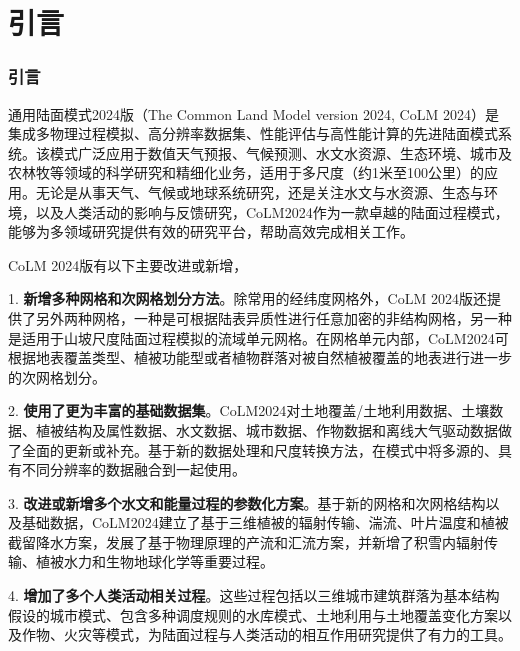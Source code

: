 \part{引言}
\section{引言}


通用陆面模式2024版（The Common Land Model version 2024, CoLM 2024）是集成多物理过程模拟、高分辨率数据集、性能评估与高性能计算的先进陆面模式系统。该模式广泛应用于数值天气预报、气候预测、水文水资源、生态环境、城市及农林牧等领域的科学研究和精细化业务，适用于多尺度（约1米至100公里）的应用。无论是从事天气、气候或地球系统研究，还是关注水文与水资源、生态与环境，以及人类活动的影响与反馈研究，CoLM2024作为一款卓越的陆面过程模式，能够为多领域研究提供有效的研究平台，帮助高效完成相关工作。

CoLM 2024版有以下主要改进或新增，

1. \textbf{新增多种网格和次网格划分方法}。除常用的经纬度网格外，CoLM 2024版还提供了另外两种网格，一种是可根据陆表异质性进行任意加密的非结构网格，另一种是适用于山坡尺度陆面过程模拟的流域单元网格。在网格单元内部，CoLM2024可根据地表覆盖类型、植被功能型或者植物群落对被自然植被覆盖的地表进行进一步的次网格划分。

2. \textbf{使用了更为丰富的基础数据集}。CoLM2024对土地覆盖/土地利用数据、土壤数据、植被结构及属性数据、水文数据、城市数据、作物数据和离线大气驱动数据做了全面的更新或补充。基于新的数据处理和尺度转换方法，在模式中将多源的、具有不同分辨率的数据融合到一起使用。

3. \textbf{改进或新增多个水文和能量过程的参数化方案}。基于新的网格和次网格结构以及基础数据，CoLM2024建立了基于三维植被的辐射传输、湍流、叶片温度和植被截留降水方案，发展了基于物理原理的产流和汇流方案，并新增了积雪内辐射传输、植被水力和生物地球化学等重要过程。

4. \textbf{增加了多个人类活动相关过程}。这些过程包括以三维城市建筑群落为基本结构假设的城市模式、包含多种调度规则的水库模式、土地利用与土地覆盖变化方案以及作物、火灾等模式，为陆面过程与人类活动的相互作用研究提供了有力的工具。

